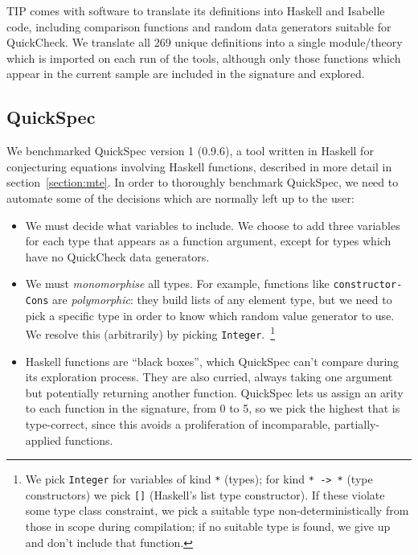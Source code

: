 TIP comes with software to translate its definitions into Haskell and Isabelle
code, including comparison functions and random data generators suitable for
QuickCheck. We translate all 269 unique definitions into a single module/theory
which is imported on each run of the tools, although only those functions which
appear in the current sample are included in the signature and explored.

\subsection{QuickSpec}

We benchmarked QuickSpec version 1 (0.9.6), a tool written in Haskell for
conjecturing equations involving Haskell functions, described in more detail in
section~\ref{section:mte}. In order to thoroughly benchmark QuickSpec, we need
to automate some of the decisions which are normally left up to the user:

\begin{sloppypar}
  \begin{itemize}
  \item We must decide what variables to include. We choose to add three
    variables for each type that appears as a function argument, except for
    types which have no QuickCheck data generators.
  \item We must \emph{monomorphise} all types. For example, functions like
    \texttt{constructor-Cons} are \emph{polymorphic}: they build lists of any
    element type, but we need to pick a specific type in order to know which
    random value generator to use. We resolve this (arbitrarily) by picking
    \texttt{Integer}.~\footnote{We pick \texttt{Integer} for variables of kind
      \texttt{*} (types); for kind \texttt{* -> *} (type constructors) we pick
      \texttt{[]} (Haskell's list type constructor). If these violate some
      type class constraint, we pick a suitable type non-deterministically from
      those in scope during compilation; if no suitable type is found, we give
      up and don't include that function.}
  \item Haskell functions are ``black boxes'', which QuickSpec can't compare
    during its exploration process. They are also curried, always taking one
    argument but potentially returning another function. QuickSpec lets us
    assign an arity to each function in the signature, from 0 to 5, so we pick
    the highest that is type-correct, since this avoids a proliferation of
    incomparable, partially-applied functions.
  \end{itemize}
\end{sloppypar}

